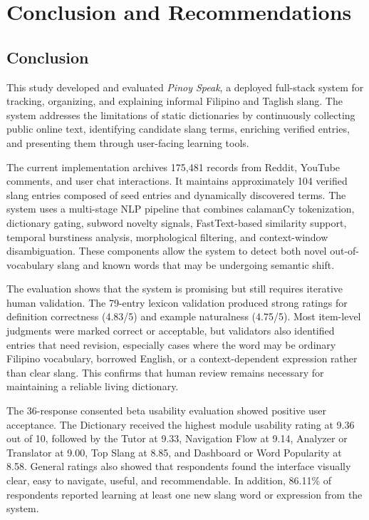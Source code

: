 \section{Conclusion and Recommendations}

\subsection{Conclusion}
This study developed and evaluated \textit{Pinoy Speak}, a deployed full-stack system for tracking, organizing, and explaining informal Filipino and Taglish slang. The system addresses the limitations of static dictionaries by continuously collecting public online text, identifying candidate slang terms, enriching verified entries, and presenting them through user-facing learning tools.

The current implementation archives 175,481 records from Reddit, YouTube comments, and user chat interactions. It maintains approximately 104 verified slang entries composed of seed entries and dynamically discovered terms. The system uses a multi-stage NLP pipeline that combines calamanCy tokenization, dictionary gating, subword novelty signals, FastText-based similarity support, temporal burstiness analysis, morphological filtering, and context-window disambiguation. These components allow the system to detect both novel out-of-vocabulary slang and known words that may be undergoing semantic shift.

The evaluation shows that the system is promising but still requires iterative human validation. The 79-entry lexicon validation produced strong ratings for definition correctness (4.83/5) and example naturalness (4.75/5). Most item-level judgments were marked correct or acceptable, but validators also identified entries that need revision, especially cases where the word may be ordinary Filipino vocabulary, borrowed English, or a context-dependent expression rather than clear slang. This confirms that human review remains necessary for maintaining a reliable living dictionary.

The 36-response consented beta usability evaluation showed positive user acceptance. The Dictionary received the highest module usability rating at 9.36 out of 10, followed by the Tutor at 9.33, Navigation Flow at 9.14, Analyzer or Translator at 9.00, Top Slang at 8.85, and Dashboard or Word Popularity at 8.58. General ratings also showed that respondents found the interface visually clear, easy to navigate, useful, and recommendable. In addition, 86.11\% of respondents reported learning at least one new slang word or expression from the system.

